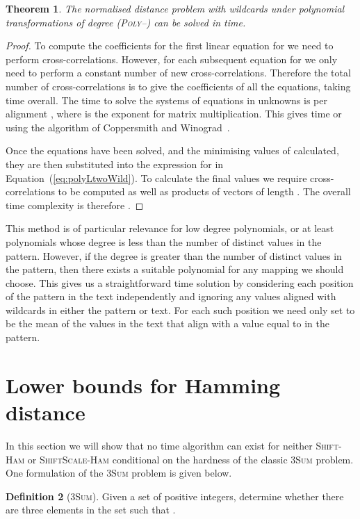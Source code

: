 \documentclass[11pt]{article}
\newcommand{\LpolyWild}{\textsc{Poly--}\xspace}
\newcommand{\sHam}{\textsc{Shift-Ham}\xspace}
\newcommand{\ssHam}{\textsc{ShiftScale-Ham}\xspace}
\newcommand{\threeSUM}{\textsc{3Sum}\xspace}
\theoremstyle{plain}
\newtheorem{theorem}{Theorem}[]
\theoremstyle{definition}
\newtheorem{definition}[theorem]{Definition}
\begin{document}
\begin{theorem}
    The normalised  distance problem with wildcards under polynomial transformations of degree  (\LpolyWild) can be solved in   time.
\end{theorem}
\begin{proof}
    To compute the coefficients for the first linear equation for  we need to perform  cross-correlations.  However, for each subsequent equation for  we only need to perform a constant number of new cross-correlations.  Therefore the total number of cross-correlations is  to give the coefficients of all the equations, taking  time overall.  The time to solve the systems of  equations in  unknowns is  per alignment , where  is the exponent for matrix multiplication.  This gives  time or  using the algorithm of Coppersmith and Winograd~\cite{CW:1990}.

    Once the equations have been solved, and the minimising values of  calculated, they are then substituted into the expression for  in Equation~(\ref{eq:polyLtwoWild}).   To calculate the final values  we require  cross-correlations to be computed as well as  products of vectors of length .  The overall time complexity is therefore .
\end{proof}

This method is of particular relevance for low degree polynomials, or at least polynomials whose degree is less than the number of distinct values in the pattern.  However, if the degree  is greater than the number of distinct values in the pattern, then there exists a suitable polynomial  for any  mapping we should choose.  This gives us a straightforward  time solution by considering each position of the pattern in the text independently and ignoring any values aligned with wildcards in either the pattern or text. For each such position we need only set  to be the mean of the values in the text that align with a value equal to  in the pattern.


\section{Lower bounds for Hamming distance}\label{sec:3SUM}

In this section we will show that no  time algorithm can exist for neither \sHam or \ssHam conditional on the hardness of the classic \threeSUM problem. One formulation of the \threeSUM problem is given below.

\begin{definition}[\threeSUM]
    \label{def:threeSUM}
    Given a set of  positive integers, determine whether there are three elements  in the set such that .
\end{definition}
\end{document}
